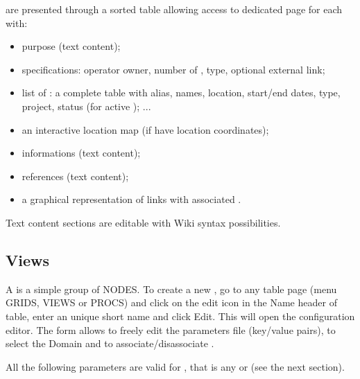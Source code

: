  are presented through a sorted table allowing access to dedicated page for each  with:
\begin{itemize}
\item    purpose (text content);
\item    specifications: operator owner, number of , type, optional external link;
\item    list of : a complete table with alias, names, location, start/end dates, type, project, status (for active ); ...
\item    an interactive location map (if  have location coordinates);
\item    informations (text content);
\item    references (text content);
\item    a graphical representation of  links with associated .
\end{itemize}

Text content sections are editable with Wiki syntax possibilities.






\subsection{Views}
\label{views}

A  is a simple group of NODES. To create a new , go to any  table page (menu GRIDS, VIEWS or PROCS) and click on the edit icon in the Name header of table, enter an unique short name and click Edit. This will open the  configuration editor. The form allows to freely edit the parameters file (key/value pairs), to select the Domain and to associate/disassociate .



All the following parameters are valid for , that is any  or  (see the next section).


